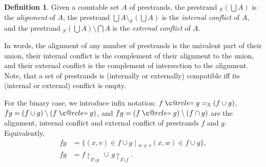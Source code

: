 \documentclass [a4paper,12pt] {article}
\makeatletter
\theoremstyle{definition}
\newtheorem{definition}{Definition}[section]
\newcommand{\Exists}{}
\DeclareRobustCommand{\Exists}{\displaystyle\mathop{\textstyle\mathlarger{\exists}}}
\newcommand{\inconflict}{}
\DeclareRobustCommand{\inconflict}{\mathbin{\sharp}}
\newcommand{\exconflict}{}
\DeclareRobustCommand{\exconflict}{\mathbin{\natural}}
\newcommand{\domain}{}
\DeclareRobustCommand{\domain}{\mathop{\textstyle\mathsmaller{\bf {Dom}}}}
\newcommand{\uni}{}
\DeclareRobustCommand{\uni}{{\textstyle\mathlarger{\mathfrak{u}}}}
\newcommand\c@rcle[2]{\mathbin{\ooalign{\hidewidth$#1#2$\hidewidth\crcr$#1\ocircle$}}}
\newcommand{\oeq}{\mathbin{\mathpalette\c@rcle{\raisebox{0.08em}{$\mathsmaller{=}$}}}}
\makeatother
\begin{document}
\begin {definition}\label{def-alignment-and-conflict}
Given a countable set $A$ of prestrands, the prestrand $\uni_{\mathbb
  X}(\bigcup A)$ is the {\em alignment}\/ of $A$, the prestrand
$\bigcup A \setminus \uni_{\mathbb X}(\bigcup A)$ is the {\em internal
  conflict}\/ of $A$, and the prestrand $\uni_{\mathbb X}(\bigcup A)
\setminus \bigcap A$ is the {\em external conflict}\/ of $A$.
\end {definition}

In words, the alignment of any number of prestrands is the univalent
part of their union, their internal conflict is the complement of
their alignment to the union, and their external conflict is the
complement of intersection to the alignment.  Note, that a set of
prestrands is (internally or externally) compatible iff its (internal
or external) conflict is empty.

For the binary case, we introduce infix notation: $f\oeq g =
\uni_{\mathbb X}(f\cup g)$, $f \inconflict g = (f \cup g) \setminus (f
\oeq g)$, and $f \exconflict g = (f \oeq g) \setminus (f \cap g)$ are
the alignment, internal conflict and external conflict of prestrands
$f$ and $g$.  Equivalently,
%
\begin {align*}
  f \inconflict g &= \{ (x, v) \in f \cup g \;|\; \Exists_{w \neq v}
  (x, w) \in f \cup g\},\\
  f \exconflict g &= f{\restriction}_{{\mathbb X}\setminus
    \domain{g}}\, \cup\, g{\restriction}_{{\mathbb X}\setminus
    \domain{f}}.
\end {align*}
\end{document}
